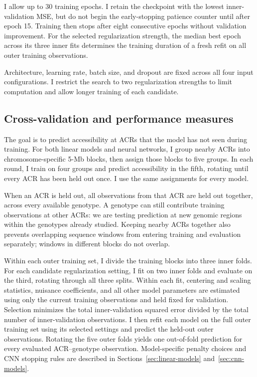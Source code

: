 \documentclass[10pt]{article}
\begin{document}
I allow up to 30 training epochs. I retain the checkpoint with
the lowest inner-validation MSE, but do not begin the early-stopping
patience counter until after epoch 15. Training then stops after
eight consecutive epochs without validation improvement. For the
selected regularization strength, the median best epoch across
its three inner fits determines the training duration of a fresh
refit on all outer training observations. 

Architecture, learning rate, batch size, and dropout are fixed
across all four input configurations. I restrict the search to
two regularization strengths to limit computation and allow
longer training of each candidate.


\subsection{Cross-validation and performance measures}\label{sec:shared-evaluation}
The goal is to predict accessibility at ACRs that the model has
not seen during training. For both linear models and neural networks, I group nearby ACRs into chromosome-specific
5-Mb blocks, then assign those blocks to five groups. In each round,
I train on four groups and predict accessibility in the fifth,
rotating until every ACR has been held out once. I use the same
assignments for every model.

When an ACR is held out, all observations from that ACR are held
out together, across every available genotype. A genotype can still
contribute training observations at other ACRs: we are testing
prediction at new genomic regions within the genotypes already
studied. Keeping nearby ACRs together also prevents overlapping
sequence windows from entering training and evaluation separately;
windows in different blocks do not overlap.

Within each outer training set, I divide the training blocks into
three inner folds. For each candidate regularization setting, I fit
on two inner folds and evaluate on the third, rotating through all
three splits. Within each fit, centering and scaling statistics,
nuisance coefficients, and all other model parameters are estimated
using only the current training observations and held fixed for
validation. Selection minimizes the total inner-validation squared
error divided by the total number of inner-validation observations.
I then refit each model on the full outer training set using its
selected settings and predict the held-out outer observations.
Rotating the five outer folds yields one out-of-fold prediction for
every evaluated ACR--genotype observation. Model-specific penalty
choices and CNN stopping rules are described in
Sections~\ref{sec:linear-models} and~\ref{sec:cnn-models}.
\end{document}
